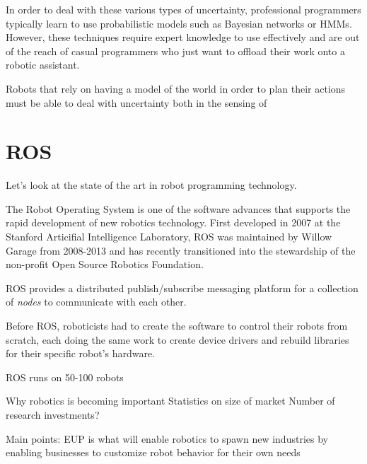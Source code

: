 \documentclass{article}
\begin{document}
In order to deal with these various types of uncertainty, professional programmers typically learn to use probabilistic models such as Bayesian networks or HMMs. However, these techniques require expert knowledge to use effectively and are out of the reach of casual programmers who just want to offload their work onto a robotic assistant.

Robots that rely on having a model of the world in order to plan their actions must be able to deal with uncertainty both in the sensing of 



\section{ROS}

Let's look at the state of the art in robot programming technology.


The Robot Operating System is one of the software advances that supports the rapid development of new robotics technology.  First developed in 2007 at the Stanford Articifial Intelligence Laboratory, ROS was maintained by Willow Garage from 2008-2013 and has recently transitioned into the stewardship of the non-profit Open Source Robotics Foundation.

ROS provides a distributed publish/subscribe messaging platform for a collection of {\em nodes} to communicate with each other.

Before ROS, roboticists had to create the software to control their robots from scratch, each doing the same work to create device drivers and rebuild libraries for their specific robot's hardware.

ROS runs on 50-100 robots



















Why robotics is becoming important
Statistics on size of market
Number of research investments?

Main points:
	EUP is what will enable robotics to spawn new industries
	by enabling businesses to customize robot behavior for their own needs
\end{document}
